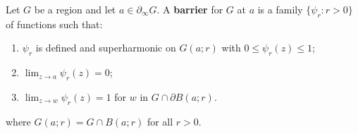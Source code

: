 Let $G$ be a region and let $a \in \partial_\infty G$. A \textbf{barrier} for $G$ at $a$ is a family $\{\psi_r: r > 0\}$ of functions such that:
\begin{enumerate}
\item[(a)] $\psi_r$ is defined and superharmonic on $G(a; r)$ with $0 \leq \psi_r(z) \leq 1$;
\item[(b)] $\displaystyle\lim_{z \to a} \psi_r(z) = 0$;
\item[(c)] $\displaystyle\lim_{z \to w} \psi_r(z) = 1$ for $w$ in $G \cap \partial B(a; r)$.
\end{enumerate}
where $G(a; r) = G \cap B(a; r)$ for all $r > 0$.
